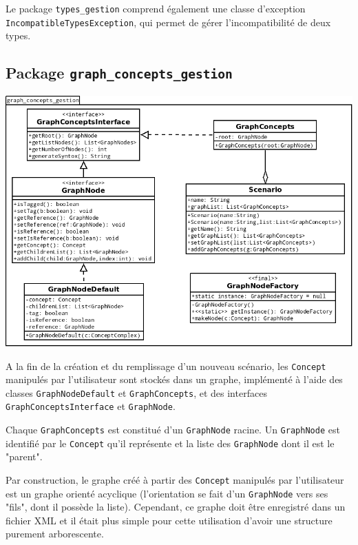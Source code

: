 \documentclass[12pt]{report}
\begin{document}
\bigskip

Le package \texttt{types\_gestion} comprend également une classe d'exception \texttt{IncompatibleTypesException}, qui permet de gérer l'incompatibilité de deux types.

\subsection{Package \texttt{graph\_concepts\_gestion}}

\begin{center}
\includegraphics[scale=0.5]{DiagLinguistic_graph_concepts_gestion.png}
\end{center}

A la fin de la création et du remplissage d'un nouveau scénario, les \texttt{Concept} manipulés par l'utilisateur sont stockés dans un graphe, implémenté à l'aide des classes \texttt{GraphNodeDefault} et \texttt{GraphConcepts}, et des interfaces \texttt{GraphConceptsInterface} et \texttt{GraphNode}.

Chaque \texttt{GraphConcepts} est constitué d'un \texttt{GraphNode} racine. Un \texttt{GraphNode} est identifié par le \texttt{Concept} qu'il représente et la liste des \texttt{GraphNode} dont il est le "parent".

\bigskip

Par construction, le graphe créé à partir des \texttt{Concept} manipulés par l'utilisateur est un graphe orienté acyclique (l'orientation se fait d'un \texttt{GraphNode} vers ses "fils", dont il possède la liste). Cependant, ce graphe doit être enregistré dans un fichier XML et il était plus simple pour cette utilisation d'avoir une structure purement arborescente. 
\end{document}
